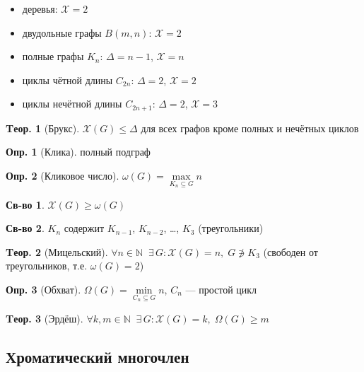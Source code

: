 \documentclass[a4paper,12pt]{article}
\numberwithin{figure}{section}
\theoremstyle{definition}
\newtheorem{definition}{Опр.}[section]
\newtheorem*{property}{Св-во}  %
\theoremstyle{definition}
\newtheorem{theorem}{Tеор.}[section]
\def\iiChi{\mathcal{X}}
\begin{document}
\begin{itemize}
  \item  деревья:  $\iiChi=2$
  \item  двудольные графы $B(m,n)$: $\iiChi=2$
  \item  полные графы $K_n$:        $\Delta=n-1$, $\iiChi=n$
  \item  циклы чётной длины $C_{2n}$:     $\Delta=2$, $\iiChi=2$
  \item  циклы нечётной длины $C_{2n+1}$: $\Delta=2$, $\iiChi=3$
\end{itemize}

\begin{theorem}[Брукс]
	$\iiChi(G) \leqslant \Delta$ для всех графов кроме полных и нечётных циклов
\end{theorem}

\begin{definition}[Клика] полный подграф \end{definition}

\begin{definition}[Кликовое число]
	$ \omega(G) = \max \limits_{K_n \subseteq G} n $
\end{definition}

\begin{property} $ \iiChi(G) \geqslant \omega(G) $ \end{property}

\begin{property} $K_n$ содержит $K_{n-1}$, $K_{n-2}$, \dots, $K_3$ (треугольники) \end{property}

\begin{theorem}[Мицельский]
	$\forall n \in \mathbb{N} \;\; \exists \, G: \iiChi(G)=n, \; G \not\owns K_3$
	(свободен от треугольников, т.е. $\omega(G)=2$)
\end{theorem}

\begin{definition}[Обхват]
	$\Omega(G) = \min \limits_{C_n \subseteq G} n $, $C_n$ --- простой цикл
\end{definition}

\begin{theorem}[Эрдёш]
	$\forall k,m \in \mathbb{N} \;\; \exists \, G: \iiChi(G)=k, \; \Omega(G) \geqslant m$
\end{theorem}


\subsection{Хроматический многочлен}
\end{document}
